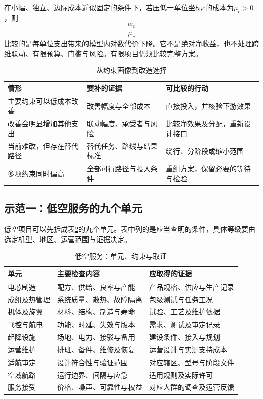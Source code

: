 在小幅、独立、边际成本近似固定的条件下，若压低一单位坐标$c$的成本为$\mu_c>0$，则
\begin{equation}
\frac{\alpha_c}{\mu_c}
\label{eq:scale-yield}
\end{equation}
比较的是每单位支出带来的模型内对数代价下降。它不是绝对净收益，也不处理跨维联动、有限预算、门槛与风险。有限项目仍须比较完整方案。

\begin{table}[ht]
\centering
\caption{从约束画像到改造选择}
\label{tab:scale-classes}
{\small
\begin{tabularx}{\textwidth}{@{}p{3.0cm}XX@{}}
\toprule
情形 & 要补的证据 & 可比较的行动\\
\midrule
主要约束可以低成本改善 & 改善幅度与全部成本 & 直接投入，并核验下游效果\\
改善会明显增加其他支出 & 联动幅度、承受者与风险 & 比较净效果及分配，重新设计接口\\
当前难改，但存在替代路径 & 替代任务、路线与结果标准 & 绕行、分阶段或缩小范围\\
多项约束同时偏高 & 全部可行路径与投入条件 & 重组方案，保留必要的等待与检验\\
\bottomrule
\end{tabularx}}
\end{table}

\subsection{示范一：低空服务的九个单元}

低空项目可以先拆成表\ref{tab:scale-lh}的九个单元。表中列的是应当查明的条件，具体等级要由选定机型、地区、运营范围与证据决定。

\begin{table}[ht]
\centering
\caption{低空服务：单元、约束与取证}
\label{tab:scale-lh}
{\small
\begin{tabularx}{\textwidth}{@{}p{3.2cm}XX@{}}
\toprule
单元 & 主要检查内容 & 应取得的证据\\
\midrule
电芯制造 & 配方、供给、良率与产能 & 产品规格、供应与生产记录\\
成组及热管理 & 系统质量、散热、故障隔离 & 包级测试与任务工况\\
机体及旋翼 & 材料、结构、制造与寿命 & 试验、工艺及维护依据\\
飞控与航电 & 功能、时延、失效与版本 & 需求、测试及审定记录\\
起降设施 & 场地、电力、接驳与备用 & 建设条件、接入与规划\\
运营维护 & 排班、备件、维修及恢复 & 运营设计与实测支持成本\\
适航审定 & 设计符合性与验证范围 & 对应辖区、型号与阶段文件\\
空域航路 & 运行边界、间隔与应急 & 适用规则及实际许可\\
服务接受 & 价格、噪声、可靠性与权益 & 对应人群的调查及运营反馈\\
\bottomrule
\end{tabularx}}
\end{table}

